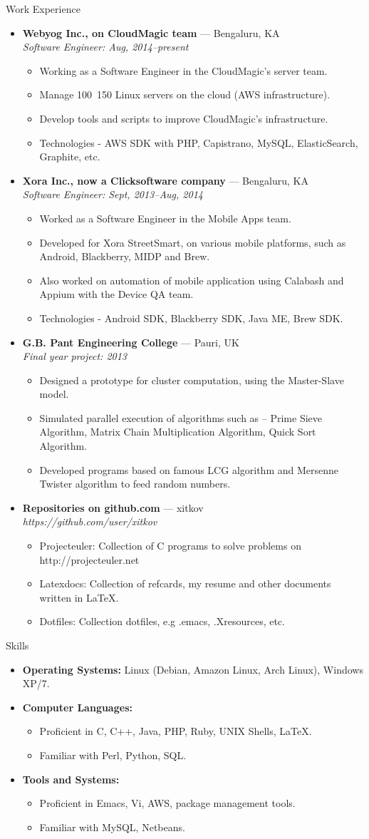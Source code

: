\documentclass[11pt,oneside]{article}
\newenvironment{ressection}[1]{
  \vspace{4pt}
	     {\fontfamily{phv}\selectfont\Large#1}
	     \begin{itemize}
	       \vspace{3pt}
}{
	     \end{itemize}
}
\newcommand{\resitem}[1]{
  \vspace{-4pt}
\item \begin{flushleft} #1 \end{flushleft}
}
\newcommand{\ressubitem}[1]{
  \vspace{-1pt}
\item \begin{flushleft} #1 \end{flushleft}
}
\newcommand{\resbigitem}[3]{
  \vspace{-5pt}
\item
  \textbf{#1} --- #2 \\
  \textit{#3}
}
\newenvironment{ressubsec}[3]{
  \resbigitem{#1}{#2}{#3}
  \vspace{-2pt}
  \begin{itemize}
}{
  \end{itemize}
}
\newenvironment{reslist}[1]{
  \resitem{\textbf{#1}}
  \vspace{-5pt}
  \begin{itemize}
}{
  \end{itemize}
}
\begin{document}
\begin{ressection}{Work Experience}
  \begin{ressubsec}{Webyog Inc., on CloudMagic team}{Bengaluru, KA}{Software Engineer: Aug, 2014--present}
    \ressubitem{Working as a Software Engineer in the CloudMagic's server team.}
    \ressubitem{Manage 100~150 Linux servers on the cloud (AWS infrastructure).}
    \ressubitem{Develop tools and scripts to improve CloudMagic's infrastructure.}
    \ressubitem{Technologies - AWS SDK with PHP, Capistrano, MySQL, ElasticSearch, Graphite, etc.}
  \end{ressubsec}
  \begin{ressubsec}{Xora Inc., now a Clicksoftware company}{Bengaluru, KA}{Software Engineer: Sept, 2013--Aug, 2014}
    \ressubitem{Worked as a Software Engineer in the Mobile Apps team.}
    \ressubitem{Developed for Xora StreetSmart, on various mobile platforms, such as Android, Blackberry, MIDP and Brew.}
    \ressubitem{Also worked on automation of mobile application using Calabash and Appium with the Device QA team.}
    \ressubitem{Technologies - Android SDK, Blackberry SDK, Java ME, Brew SDK.}
  \end{ressubsec}
  \begin{ressubsec}{G.B. Pant Engineering College}{Pauri, UK}{Final year project: 2013}
    \ressubitem{Designed a prototype for cluster computation, using the Master-Slave model.}
    \ressubitem{Simulated parallel execution of algorithms such as -- Prime Sieve Algorithm, Matrix Chain Multiplication Algorithm, Quick Sort Algorithm.}
    \ressubitem{Developed programs based on famous LCG algorithm and Mersenne Twister algorithm to feed random numbers.}
  \end{ressubsec} 
  \begin{ressubsec}{Repositories on github.com}{xitkov}{https://github.com/user/xitkov}
    \ressubitem{Projecteuler: Collection of C programs to solve problems on http://projecteuler.net}
    \ressubitem{Latexdocs:  Collection of refcards, my resume and other documents written in \LaTeX.}
    \ressubitem{Dotfiles: Collection dotfiles, e.g .emacs, .Xresources, etc.}
  \end{ressubsec} 
\end{ressection}

\begin{ressection}{Skills}
  \resitem{\textbf{Operating Systems:} Linux (Debian, Amazon Linux, Arch Linux), Windows XP/7.}
  \begin{reslist}{Computer Languages:}
	\ressubitem{Proficient in C, C++, Java, PHP, Ruby, UNIX Shells, \LaTeX.}
    \ressubitem{Familiar with Perl, Python, SQL.}
  \end{reslist}
  \begin{reslist}{Tools and Systems:}
    \ressubitem{Proficient in Emacs, Vi, AWS, package management tools.}
    \ressubitem{Familiar with MySQL, Netbeans.}
  \end{reslist}
\end{ressection}
\end{document}
